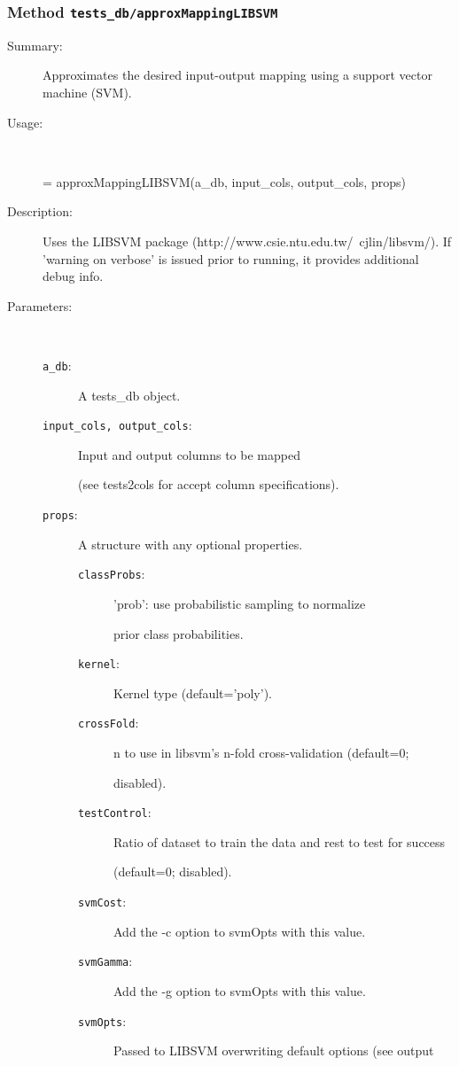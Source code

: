 \subsubsection[Method \texttt{approxMappingLIBSVM}]{Method \texttt{tests\_db/approxMappingLIBSVM}}%
%
\label{ref_tests_db__approxMappingLIBSVM}%
\hypertarget{ref_tests_db__approxMappingLIBSVM}{}%
\begin{description}
\item[Summary:]Approximates the desired input-output mapping using a support vector machine (SVM).
%
\item[Usage:]~%
\begin{lyxcode}%
[an\_approx\_db, an\_svm] = approxMappingLIBSVM(a\_db, input\_cols, output\_cols, props)
%
\end{lyxcode}%
%
\item[Description:]%
Uses the LIBSVM package (http://www.csie.ntu.edu.tw/~cjlin/libsvm/). If
 'warning on verbose' is issued prior to running, it provides additional
 debug info.
\item[Parameters:]~
\begin{description}%
\item[\texttt{a\_db}:]
 A tests\_db object.
\item[\texttt{input\_cols, output\_cols}:]
 Input and output columns to be mapped

(see tests2cols for accept column specifications).
\item[\texttt{props}:]
 A structure with any optional properties.
\begin{description}%
\item[\texttt{classProbs}:]
 'prob': use probabilistic sampling to normalize

prior class probabilities.
\item[\texttt{kernel}:]
 Kernel type (default='poly').
\item[\texttt{crossFold}:]
 n to use in libsvm's n-fold cross-validation (default=0;

disabled).
\item[\texttt{testControl}:]
 Ratio of dataset to train the data and rest to test for success

(default=0; disabled).
\item[\texttt{svmCost}:]
 Add the -c option to svmOpts with this value.
\item[\texttt{svmGamma}:]
 Add the -g option to svmOpts with this value.
\item[\texttt{svmOpts}:]
 Passed to LIBSVM overwriting default options (see output


\end{description}
\end{description}
\end{description}
